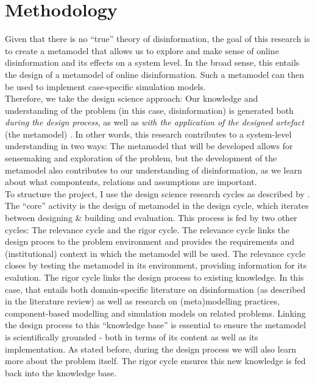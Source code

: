 \section{Methodology}
Given that there is no ``true'' theory of disinformation, the goal of this research is to create a metamodel that allows us to explore and make sense of online disinformation and its effects on a system level. In the broad sense, this entails the design of a metamodel of online disinformation. Such a metamodel  can then be used to implement case-specific simulation models. \\

Therefore, we take the design science approach: Our knowledge and understanding of the problem (in this case, disinformation) is generated both \textit{during the design process}, as well as \textit{with the application of the designed artefact} (the metamodel) \citep{Hevner2004}. In other words, this research contributes to a system-level understanding in two ways: The metamodel that will be developed allows for sensemaking and exploration of the problem, but the development of the metamodel also contributes to our understanding of disinformation, as we learn about what compontents, relations and assumptions are important. \\

To structure the project, I use the design science research cycles as described by \cite{Hevner2010}. The ``core'' activity is the design of metamodel in the design cycle, which iterates between designing \& building and evaluation. This process is fed by two other cycles: The relevance cycle and the rigor cycle. The relevance cycle links the design proces to the problem environment and provides the requirements and (institutional) context in which the metamodel will be used. The relevance cycle closes by testing the metamodel in its environment, providing information for its evalution. The rigor cycle links the design process to existing knowledge. In this case, that entails both domain-specific literature on disinformation (as described in the literature review) as well as research on (meta)modelling practices, component-based modelling and simulation models on related problems. Linking the design process to this ``knowledge base'' is essential to ensure the metamodel is scientifically grounded - both in terms of its content as well as its implementation. As stated before, during the design process we will also learn more about the problem itself. The rigor cycle ensures this new knowledge is fed back into the knowledge base.\\

